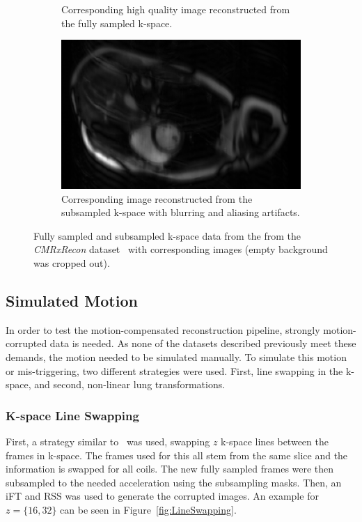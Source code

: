 \begin{figure}[h]
\begin{subfigure}{0.45\textwidth}
    		\caption{Corresponding high quality image reconstructed from the fully sampled k-space.}
    		\label{fig:fullySampledImage}
	\end{subfigure}
	\hfill
	\begin{subfigure}{0.45\textwidth}
    		\includegraphics[width=\textwidth]{image_subsampled.png}
    		\caption{Corresponding image reconstructed from the subsampled k-space with blurring and aliasing artifacts.}
    		\label{fig:subSampledImage}
	\end{subfigure}
	\caption{Fully sampled and subsampled k-space data from the from the \emph{CMRxRecon} dataset~\cite{CMRxRecon} with corresponding images (empty background was cropped out).}
	\label{fig:k-space}
\end{figure}

\subsection{Simulated Motion} \label{SubSec:SimulatedMotion}
In order to test the motion-compensated reconstruction pipeline, strongly motion-corrupted data is needed. As none of the datasets described previously meet these demands, the motion needed to be simulated manually. To simulate this motion or mis-triggering, two different strategies were used. First, line swapping in the k-space, and second, non-linear lung transformations.

\subsubsection{K-space Line Swapping}
First, a strategy similar to~\cite{Oksuz2020} was used, swapping $z$ k-space lines between the frames in k-space. The frames used for this all stem from the same slice and the information is swapped for all coils. The new fully sampled frames were then subsampled to the needed acceleration using the subsampling masks. Then, an iFT and RSS was used to generate the corrupted images. An example for $z=\{16,32\}$ can be seen in Figure~\ref{fig:LineSwapping}. 



